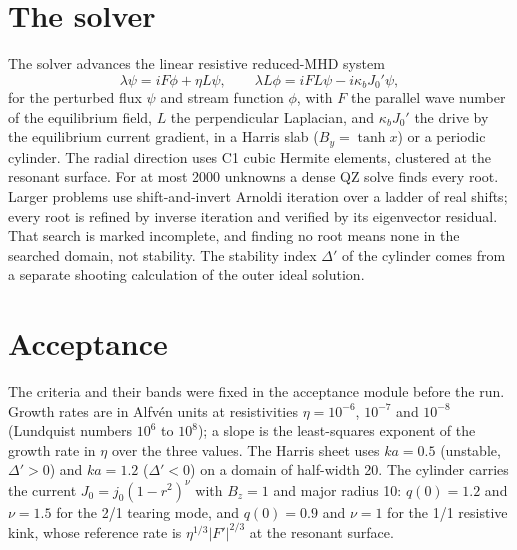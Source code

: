 \documentclass[11pt]{article}
\begin{document}
\section{The solver}

The solver advances the linear resistive reduced-MHD system
\begin{equation}
\lambda \psi = i F \phi + \eta L \psi, \qquad
\lambda L \phi = i F L \psi - i \kappa_b J_0' \psi,
\end{equation}
for the perturbed flux $\psi$ and stream function $\phi$, with $F$ the
parallel wave number of the equilibrium field, $L$ the perpendicular
Laplacian, and $\kappa_b J_0'$ the drive by the equilibrium current gradient, in a Harris slab ($B_y = \tanh
x$) or a periodic cylinder.  The radial direction uses C1 cubic Hermite
elements, clustered at the resonant surface.  For at most 2000 unknowns a
dense QZ solve finds every root.  Larger problems use shift-and-invert Arnoldi
iteration over a ladder of real shifts; every root is refined by inverse
iteration and verified by its eigenvector residual.  That search is marked
incomplete, and finding no root means none in the searched domain, not
stability.  The stability index $\Delta'$ of the cylinder comes from a separate
shooting calculation of the outer ideal solution.

\section{Acceptance}

The criteria and their bands were fixed in the acceptance module before the
run.  Growth rates are in Alfv\'en units at resistivities $\eta = 10^{-6}$,
$10^{-7}$ and $10^{-8}$ (Lundquist numbers $10^6$ to $10^8$); a slope is the
least-squares exponent of the growth rate in $\eta$ over the three values.  The
Harris sheet uses $ka = 0.5$ (unstable, $\Delta' > 0$) and $ka = 1.2$
($\Delta' < 0$) on a domain of half-width 20.  The cylinder carries the current
$J_0 = j_0 (1 - r^2)^\nu$ with $B_z = 1$ and major radius 10: $q(0) = 1.2$ and
$\nu = 1.5$ for the 2/1 tearing mode, and $q(0) = 0.9$ and $\nu = 1$ for the
1/1 resistive kink, whose reference rate is $\eta^{1/3} |F'|^{2/3}$ at the
resonant surface.
\end{document}
